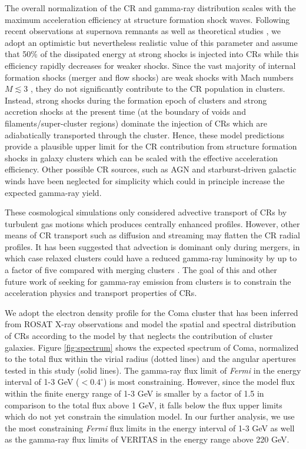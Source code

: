 \documentclass[12pt,manuscript]{aastex}
\begin{document}
The overall normalization of the CR and gamma-ray distribution scales with the maximum acceleration
efficiency at structure formation shock waves. Following recent observations at supernova remnants
\citep{article:Helder_etal:2009} as well as theoretical studies \citep{article:KangJones:2005}, we
adopt an optimistic but nevertheless realistic value of this parameter and assume that 50\% of the
dissipated energy at strong shocks is injected into CRs while this efficiency rapidly decreases for
weaker shocks. Since the vast majority of internal formation shocks (merger and flow shocks) are
weak shocks with Mach numbers $M\lesssim3$ \citep[e.g.,][]{article:Ryu_etal:2003}, they do not
significantly contribute to the CR population in clusters. Instead, strong shocks during the
formation epoch of clusters and strong accretion shocks at the present time (at the boundary of
voids and filaments/super-cluster regions) dominate the injection of CRs which are adiabatically
transported through the cluster. Hence, these model predictions provide a plausible upper limit for
the CR contribution from structure formation shocks in galaxy clusters which can be scaled with the
effective acceleration efficiency. Other possible CR sources, such as AGN and starburst-driven
galactic winds have been neglected for simplicity which could in principle increase the expected
gamma-ray yield.

These cosmological simulations only considered advective transport of CRs by turbulent gas motions
which produces centrally enhanced profiles.  However, other means of CR transport such as diffusion
and streaming may flatten the CR radial profiles. It has been suggested that advection is dominant
only during mergers, in which case relaxed clusters could have a reduced gamma-ray luminosity by up
to a factor of five compared with merging clusters
\citep{article:EnsslinPfrommerMiniatiSubramanian:2011}. The goal of this and other future work of
seeking for gamma-ray emission from clusters is to constrain the acceleration physics and transport
properties of CRs.

We adopt the electron density profile for the Coma cluster that has been inferred from ROSAT X-ray
observations \citep{article:BrielHenryBohringer:1992} and model the spatial and spectral
distribution of CRs according to the model by \citet{article:PinzkePfrommer:2010} that neglects the
contribution of cluster galaxies. Figure \ref{fig:spectrum} shows the expected spectrum of Coma,
normalized to the total flux within the virial radius (dotted lines) and the angular apertures
tested in this study (solid lines). The gamma-ray flux limit of {\em Fermi} in the energy interval
of 1-3 GeV ($<0.4^\circ$) is most constraining. However, since the model flux within the finite
energy range of 1-3 GeV is smaller by a factor of 1.5 in comparison to the total flux above 1 GeV,
it falls below the flux upper limits which do not yet constrain the simulation model. In our
further analysis, we use the most constraining {\em Fermi} flux limits in the energy interval of
1-3 GeV as well as the gamma-ray flux limits of VERITAS in the energy range above 220 GeV.
\end{document}

